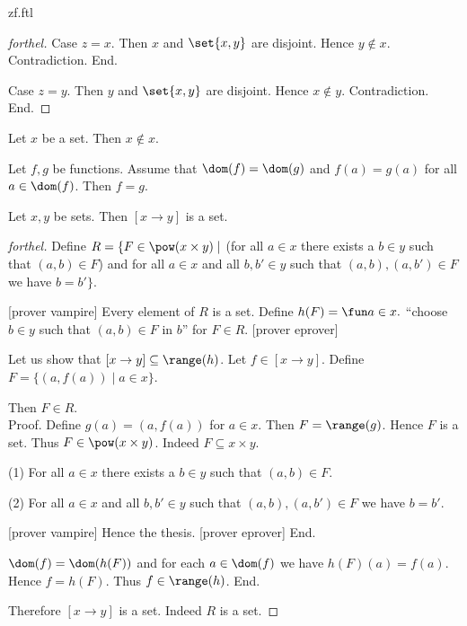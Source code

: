 \documentclass{naproche-library}
\begin{document}
\begin{smodule}{zf.ftl}
\begin{proof}[forthel]
    Case $z = x$.
      Then $x$ and $\set{x,y}$ are disjoint.
      Hence $y \notin x$.
      Contradiction.
    End.

    Case $z = y$.
      Then $y$ and $\set{x,y}$ are disjoint.
      Hence $x \notin y$.
      Contradiction.
    End.
  \end{proof}

  \begin{corollary}[forthel,id=FOUNDATIONS_10_3086917813927936]
    Let $x$ be a set.
    Then $x \notin x$.
  \end{corollary}

  \begin{proposition}[forthel,id=FOUNDATIONS_10_4589652321021547]
    Let $f, g$ be functions.
    Assume that $\dom(f) = \dom(g)$ and $f(a) = g(a)$ for all $a \in \dom(f)$.
    Then $f = g$.
  \end{proposition}

  \begin{proposition}[forthel,id=FOUNDATIONS_10_4105036244189184]
    Let $x, y$ be sets.
    Then $[x \to y]$ is a set.
  \end{proposition}
  \begin{proof}[forthel]
    Define $R = \{ F \in \pow(x \times y) \mid$ (for all $a \in x$ there exists a $b \in y$ such that $(a,b) \in F$) and for all $a \in x$ and all $b, b' \in y$ such that $(a,b), (a,b') \in F$ we have $b = b' \}$.

    [prover vampire]
    Every element of $R$ is a set. %
    Define $h(F) = \fun a \in x.$ ``choose $b \in y$ such that $(a,b) \in F$ in $b$'' for $F \in R$.
    [prover eprover]

    Let us show that $[x \to y] \subseteq \range(h)$.
      Let $f \in [x \to y]$.
      Define $F = \{ (a,f(a)) \mid a \in x \}$.

      Then $F \in R$. \\
      Proof.
        Define $g(a) = (a,f(a))$ for $a \in x$.
        Then $F = \range(g)$.
        Hence $F$ is a set.
        Thus $F \in \pow(x \times y)$.
        Indeed $F \subseteq x \times y$.

        (1) For all $a \in x$ there exists a $b \in y$ such that $(a,b) \in F$.

        (2) For all $a \in x$ and all $b, b' \in y$ such that $(a,b),
        (a,b') \in F$ we have $b = b'$.

        [prover vampire]
        Hence the thesis.
        [prover eprover]
      End.

      $\dom(f) = \dom(h(F))$ and for each $a \in \dom(f)$ we have $h(F)(a) = f(a)$.
      Hence $f = h(F)$.
      Thus $f \in \range(h)$.
    End.

    Therefore $[x \to y]$ is a set.
    Indeed $R$ is a set.
  \end{proof}
\end{smodule}
\end{document}
